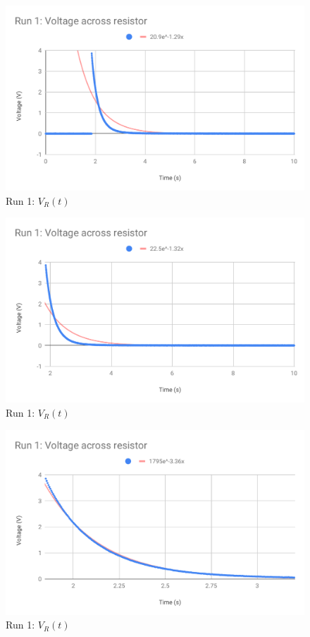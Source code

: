 %
\begin{figure}[ht]
    \centering
    \includegraphics[scale=0.74]{image/05-RC-RL/run-1-vR-full.pdf}
    \caption{Run 1: $V_{R}(t)$}
    \label{figure.05.run.1.vR.full}
\end{figure}
%
\begin{figure}[ht]
    \centering
    \includegraphics[scale=0.74]{image/05-RC-RL/run-1-vR-truncated.pdf}
    \caption{Run 1: $V_{R}(t)$}
    \label{figure.05.run.1.vR.truncated}
\end{figure}
%
\begin{figure}[ht]
    \centering
    \includegraphics[scale=0.74]{image/05-RC-RL/run-1-vR-no-tail.pdf}
    \caption{Run 1: $V_{R}(t)$}
    \label{figure.05.run.1.vR.no.tail}
\end{figure}
